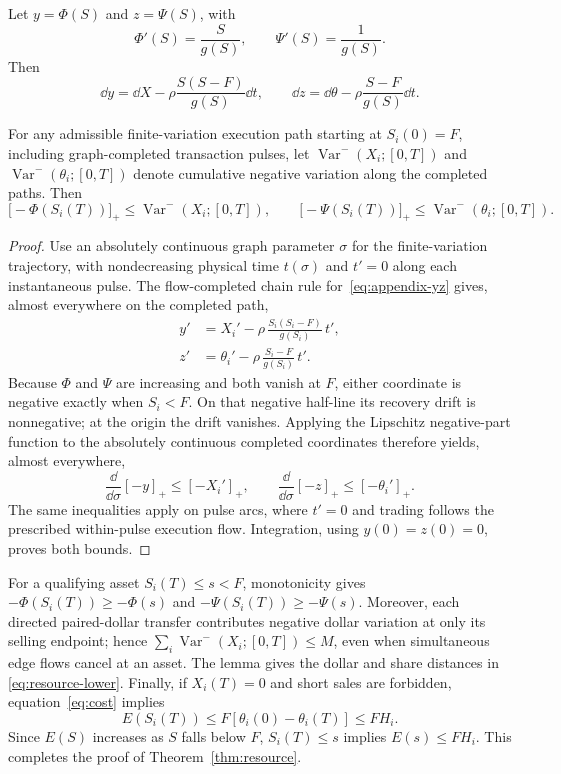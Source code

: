 \documentclass[review,hidelinks,onefignum,onetabnum]{siamonline250211}
\begin{document}
Let $y=\Phi(S)$ and $z=\Psi(S)$, with
\[
\Phi'(S)=\frac{S}{g(S)},\qquad \Psi'(S)=\frac1{g(S)}.
\]
Then
\begin{equation}\label{eq:appendix-yz}
\dd y=\dd X-\rho\frac{S(S-F)}{g(S)}\dd t,
\qquad
\dd z=\dd\theta-\rho\frac{S-F}{g(S)}\dd t.
\end{equation}
\begin{lemma}
\label{lem:one-sided-BV}
For any admissible finite-variation execution path starting at
$S_i(0)=F$, including graph-completed transaction pulses, let
$\operatorname{Var}^{-}(X_i;[0,T])$ and
$\operatorname{Var}^{-}(\theta_i;[0,T])$ denote cumulative
negative variation along the completed paths. Then
\[
\big[-\Phi(S_i(T))\big]_+
 \le\operatorname{Var}^{-}(X_i;[0,T]),
\qquad
\big[-\Psi(S_i(T))\big]_+
 \le\operatorname{Var}^{-}(\theta_i;[0,T]).
\]
\end{lemma}
\begin{proof}
Use an absolutely continuous graph parameter $\sigma$ for the
finite-variation trajectory, with nondecreasing physical time
$t(\sigma)$ and $t'=0$ along each instantaneous pulse. The
flow-completed chain rule for~\eqref{eq:appendix-yz} gives,
almost everywhere on the completed path,
\[
\begin{aligned}
y'&=X_i'-\rho\,\frac{S_i(S_i-F)}{g(S_i)}\,t',\\
z'&=\theta_i'-\rho\,\frac{S_i-F}{g(S_i)}\,t'.
\end{aligned}
\]
Because $\Phi$ and $\Psi$ are increasing and both vanish at
$F$, either coordinate is negative exactly when $S_i<F$.
On that negative half-line its recovery drift is
nonnegative; at the origin the drift vanishes. Applying the
Lipschitz negative-part function to the absolutely continuous
completed coordinates therefore yields, almost everywhere,
\[
\frac{\dd}{\dd\sigma}[-y]_+\le[-X_i']_+,
\qquad
\frac{\dd}{\dd\sigma}[-z]_+\le[-\theta_i']_+.
\]
The same inequalities apply on pulse arcs, where $t'=0$ and
trading follows the prescribed within-pulse execution flow.
Integration, using $y(0)=z(0)=0$, proves both bounds.
\end{proof}

For a qualifying asset $S_i(T)\le s<F$, monotonicity gives
$-\Phi(S_i(T))\ge-\Phi(s)$ and
$-\Psi(S_i(T))\ge-\Psi(s)$.
Moreover, each directed paired-dollar transfer contributes
negative dollar variation at only its selling endpoint; hence
$\sum_i\operatorname{Var}^{-}(X_i;[0,T])\le M$, even when
simultaneous edge flows cancel at an asset.
The lemma gives the dollar and share distances in
\eqref{eq:resource-lower}. Finally, if $X_i(T)=0$ and short
sales are forbidden, equation~\eqref{eq:cost} implies
\[
E(S_i(T))\le F[\theta_i(0)-\theta_i(T)]\le FH_i.
\]
Since $E(S)$ increases as $S$ falls below $F$,
$S_i(T)\le s$ implies $E(s)\le FH_i$.
This completes the proof of Theorem~\ref{thm:resource}.
\end{document}
